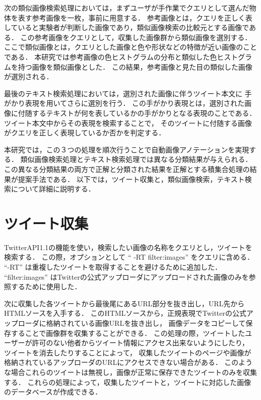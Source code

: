 \documentclass{deimj}
\begin{document}
次の類似画像検索処理においては，まずユーザが手作業でクエリとして選んだ物体を表す参考画像を一枚，事前に用意する．
参考画像とは，クエリを正しく表していると実験者が判断した画像であり，類似画像検索の比較元とする画像である．
この参考画像をクエリとして，収集した画像群から類似画像を選別する．
ここで類似画像とは，クエリとした画像と色や形状などの特徴が近い画像のことである．
本研究では参考画像の色ヒストグラムの分布と類似した色ヒストグラムを持つ画像を類似画像とした．
この結果，参考画像と見た目の類似した画像が選別される．

最後のテキスト検索処理においては，選別された画像に伴うツイート本文に
手がかり表現を用いてさらに選別を行う．
この手がかり表現とは，選別された画像に付随するテキストが何を表しているかの手がかりとなる表現のことである．
ツイート本文中からその表現を検索することで，
そのツイートに付随する画像がクエリを正しく表現しているか否かを判定する．

本研究では，この３つの処理を順次行うことで自動画像アノテーションを実現する．
類似画像検索処理とテキスト検索処理では異なる分類結果が与えられる．
この異なる分類結果の両方で正解と分類された結果を正解とする積集合処理の結果が提案手法である．
以下では，ツイート収集と，類似画像検索，テキスト検索について詳細に説明する．

\section{ツイート収集}
\label{sec:tweetCollect}
TwitterAPI1.1の機能を使い，検索したい画像の名称をクエリとし，ツイートを検索する．
この際，オプションとして “ -RT filter:images” をクエリに含める．
“-RT” は重複したツイートを取得することを避けるために追加した．
“filter:images” はTwitterの公式アップローダにアップロードされた画像のみを参照するために使用した．

次に収集した各ツイートから最後尾にあるURL部分を抜き出し，URL先からHTMLソースを入手する．
このHTMLソースから，正規表現でTwitterの公式アップローダに格納されている画像URLを抜き出し，
画像データをコピーして保存することで画像群を収集することができる．
この処理の際，ツイートしたユーザーが許可のない他者からツイート情報にアクセス出来ないようにしたり，
ツイートを消去したりすることによって，
収集したツイートのページや画像が格納されているアップローダのURLにアクセスできない場合がある．
このような場合これらのツイートは無視し，画像が正常に保存できたツイートのみを収集する．
これらの処理によって，収集したツイートと，ツイートに対応した画像のデータベースが作成できる．
\end{document}
